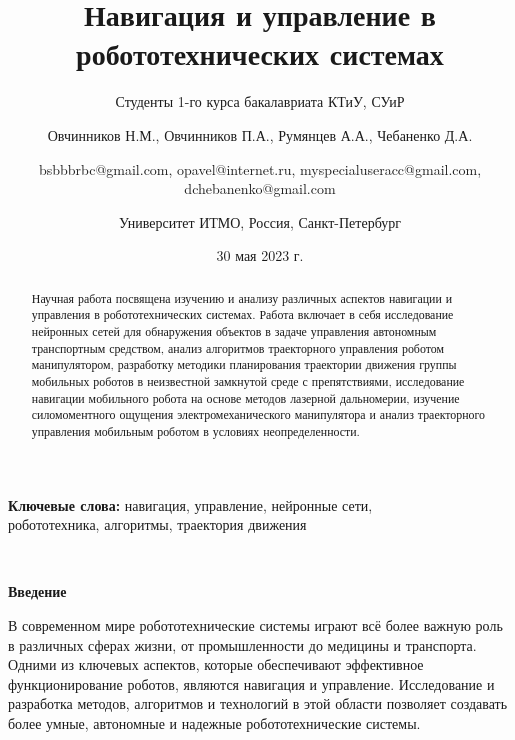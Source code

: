 \documentclass[russian,11pt]{article}
\title{\textbf{Навигация и управление в робототехнических системах}}
\author{Студенты 1-го курса бакалавриата КТиУ, СУиР \and Овчинников Н.М., Овчинников П.А., Румянцев А.А., Чебаненко Д.А. \and bsbbbrbc@gmail.com, opavel@internet.ru, myspecialuseracc@gmail.com, dchebanenko@gmail.com \and Университет ИТМО, Россия, Санкт-Петербург}
\date{30 мая 2023 г.}
\providecommand{\keywords}[1]{
\begin{flushright}
\small	
\textbf{Ключевые слова:} #1
\end{flushright}
}
\providecommand{\header}[1]{
\,
\begin{center}
{\Large \textbf{#1}}
\end{center}
}
\begin{document}
\maketitle
\begin{abstract}
\begin{center}
Научная работа посвящена изучению и анализу различных аспектов навигации и управления в робототехнических системах. Работа включает в себя исследование нейронных сетей для обнаружения объектов в задаче управления автономным транспортным средством, анализ алгоритмов траекторного управления роботом манипулятором, разработку методики планирования траектории движения группы мобильных роботов в неизвестной замкнутой среде с препятствиями, исследование навигации мобильного робота на основе методов лазерной дальномерии, изучение силомоментного ощущения электромеханического манипулятора и анализ траекторного управления мобильным роботом в условиях неопределенности.
\end{center}
\end{abstract}
\keywords{навигация, управление, нейронные сети, \\ робототехника, алгоритмы, траектория движения}
\header{Введение}

В современном мире робототехнические системы играют всё более важную роль в различных сферах жизни, от промышленности до медицины и транспорта. Одними из ключевых аспектов, которые обеспечивают эффективное функционирование роботов, являются навигация и управление. Исследование и разработка методов, алгоритмов и технологий в этой области позволяет создавать более умные, автономные и надежные робототехнические системы.
\end{document}
